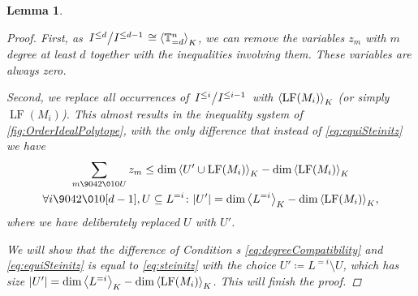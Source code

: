 \documentclass[11pt,oneside,english]{amsart}
\makeatletter
\numberwithin{equation}{section}
\numberwithin{figure}{section}
\theoremstyle{plain}
\theoremstyle{definition}
\theoremstyle{definition}
\theoremstyle{remark}
\theoremstyle{plain}
\newtheorem{lem}[thm]{Lemma}
\theoremstyle{plain}
\theoremstyle{plain}
\theoremstyle{problem@}
\makeatother
\begin{document}
\begin{lem}
\begin{proof}
First, as \(\left. I^{\leq d} \middle/ I^{\leq d-1} \right. \cong
{{\left\langle {{\mathbb{T}}^n_{= d}}\right\rangle}\sb{K}}\),
we can remove the variables \(z_m\) with \(m\) degree at least \(d\)
together with the inequalities involving them.
These variables are always zero.

Second, we replace all occurrences of \(\left. I^{\leq i} \middle/ I^{\leq i-1} \right.\) with
\({{\left\langle {\operatorname{LF}(M_{i})}\right\rangle}\sb{K}}\) (or simply \(\operatorname{LF}(M_{i})\)).
This almost results in the inequality system of
\autoref{fig:OrderIdealPolytope},
with the only difference that instead of \autoref{eq:equiSteinitz}
we have
\begin{multline}
  \sum_{m{\9042\010} U}z_{m} \leq
    \dim{{\left\langle {U'\cup\operatorname{LF}(M_{i})}\right\rangle}\sb{K}}-\dim{{\left\langle {\operatorname{LF}(M_{i})}\right\rangle}\sb{K}}\label{eq:steinitz} \\
    \forall i{\9042\010}[d-1],U\subseteq L^{=i}\colon \lvert U'
    \rvert=\dim{{\left\langle {L^{=i}}\right\rangle}\sb{K}}-\dim{{\left\langle {\operatorname{LF}(M_{i})}\right\rangle}\sb{K}},
\end{multline}
where we have deliberately replaced \(U\) with \(U'\).

We will show that the difference of {Condition} s
\ref{eq:degreeCompatibility} and \ref{eq:equiSteinitz}
is equal to \autoref{eq:steinitz} with the choice
$U'\coloneqq L^{=i}\setminus U$,
which has size $\lvert U' \rvert=\dim{{\left\langle {L^{=i}}\right\rangle}\sb{K}}-\dim{{\left\langle {\operatorname{LF}(M_{i})}\right\rangle}\sb{K}}$.
This will finish the proof.


\end{proof}
\end{lem}
\end{document}
